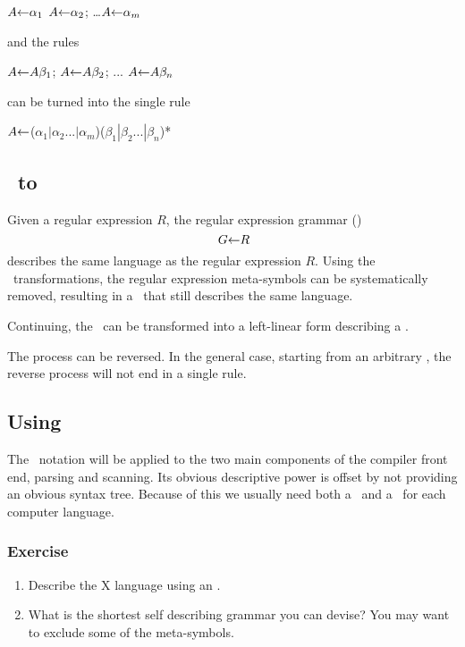 $A\mbox{$\leftarrow$}\alpha_1$ \quad $A\mbox{$\leftarrow$}\alpha_2$; \ldots $A\mbox{$\leftarrow$}\alpha_m$

\noindent
and the rules

$A\mbox{$\leftarrow$} A\beta_1$; $A\mbox{$\leftarrow$} A\beta_2$; ... $A\mbox{$\leftarrow$} A\beta_n$

\noindent
can be turned into the single rule

$A\mbox{$\leftarrow$}$($\alpha_1|\alpha_2 ... |\alpha_m$)($\beta_1|\beta_2 ... |\beta_n$)*


\subsection{\reg\ to \cfg}

Given a regular expression $R$, the regular expression grammar (\reg)
\begin{displaymath}
\>G\mbox{$\leftarrow$} R
\end{displaymath}
describes the same language as the regular expression $R$.
Using the \reg\ transformations, the regular expression meta-symbols
can be systematically removed, resulting in a \cfg\ that 
still describes the same language.

Continuing, the \cfg\ can be transformed into a left-linear form
describing a \dfa.

The process can be reversed.
In the general case, starting from an arbitrary \cfg,
the reverse process will not end in a single rule.

\subsection{Using }

The \reg\ notation will be applied to the two main components of the 
compiler front end, parsing and scanning.  
Its obvious descriptive power is offset by not providing an obvious 
syntax tree.  Because of this we usually need both a \cfg\
and a \reg\ for each computer language.

\subsubsection{Exercise}
\begin{enumerate}\setcounter{enumi}{\value{RunningExercise}}

\item Describe the X language using an \reg.

\item What is the shortest self describing grammar 
you can devise?  You may want to exclude some of the meta-symbols.

\setcounter{RunningExercise}{\value{enumi}}
\end{enumerate}




